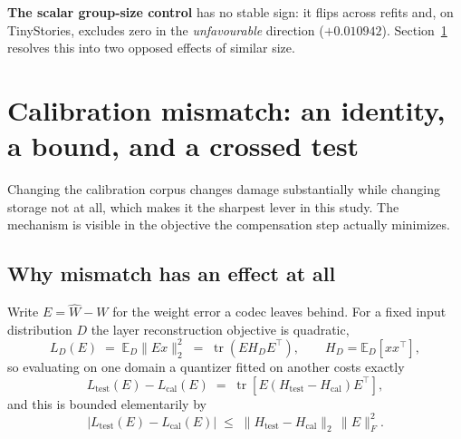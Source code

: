\documentclass[11pt]{article}
\begin{document}
\textbf{The scalar group-size control} has no stable sign: it flips across
refits and, on TinyStories, excludes zero in the \emph{unfavourable} direction
($+0.010942$). Section~\ref{sec:calibration} resolves this into two opposed
effects of similar size.

\section{Calibration mismatch: an identity, a bound, and a crossed test}
\label{sec:calibration}

Changing the calibration corpus changes damage substantially while changing
storage not at all, which makes it the sharpest lever in this study. The
mechanism is visible in the objective the compensation step actually minimizes.

\subsection{Why mismatch has an effect at all}

Write $E = \widehat{W} - W$ for the weight error a codec leaves behind. For a
fixed input distribution $D$ the layer reconstruction objective is quadratic,
\begin{equation}
L_D(E) \;=\; \mathbb{E}_D \lVert E x \rVert_2^2
      \;=\; \operatorname{tr}\!\left( E H_D E^{\top} \right),
\qquad H_D = \mathbb{E}_D\!\left[ x x^{\top} \right],
\end{equation}
so evaluating on one domain a quantizer fitted on another costs exactly
\begin{equation}
L_{\mathrm{test}}(E) - L_{\mathrm{cal}}(E)
  \;=\; \operatorname{tr}\!\left[ E \left( H_{\mathrm{test}} - H_{\mathrm{cal}} \right) E^{\top} \right],
\label{eq:mismatch}
\end{equation}
and this is bounded elementarily by
\begin{equation}
\left\lvert L_{\mathrm{test}}(E) - L_{\mathrm{cal}}(E) \right\rvert
  \;\le\; \lVert H_{\mathrm{test}} - H_{\mathrm{cal}} \rVert_2 \, \lVert E \rVert_F^2 .
\label{eq:bound}
\end{equation}
\end{document}

